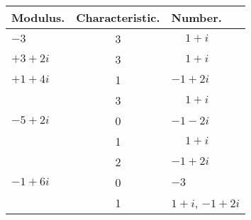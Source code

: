 \documentclass[twoside,12pt]{memoir}
\begin{document}
\begin{center}
\begin{tabular}{l|c|l}
Modulus. & Characteristic. & Number. \\
\hline
\(-3\) & 3 & \(\phantom{+}1+i\) \\
\(+3+2 i\) & 3 & \(\phantom{+}1+i\) \\
\(+1+4 i\) & 1 & \(-1+2 i\) \\
 & 3 & \(\phantom{+}1+i\) \\
\(-5+2 i\)& 0 & \(-1-2 i\) \\
 & 1 & \(\phantom{+}1+i\) \\
& 2 & \(-1+2 i\) \\
\(-1+6 i\) & 0 & \(-3\) \\
 &1&\(1+i\), \(-1+2i\)
\end{tabular}\pagebreak%


\end{center}
\end{document}
